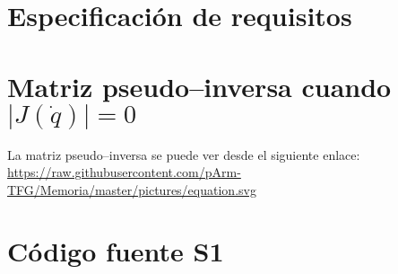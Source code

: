 \chapter{Especificación de requisitos}
\label{anex:requirements}


\newpage
\chapter{Matriz pseudo--inversa cuando $\left|J\left(\dot{q}\right)\right| = 0$}
\label{anex:pinv}
La matriz pseudo--inversa se puede ver desde el siguiente enlace:
\url{https://raw.githubusercontent.com/pArm-TFG/Memoria/master/pictures/equation.svg}\qquad
{}

\chapter{Código fuente \ac{S1}}















